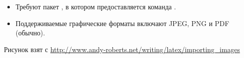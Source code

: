\documentclass{beamer}
\begin{document}
\begin{frame}[fragile]
\frametitle{\insertsubsection}
\begin{itemize}
\item Требуют пакет , в котором предоставляется команда
.
\item Поддерживаемые графические форматы включают JPEG, PNG и PDF (обычно).
\end{itemize}

\tiny{Рисунок взят с \url{http://www.andy-roberts.net/writing/latex/importing_images}}
\end{frame}
\end{document}
